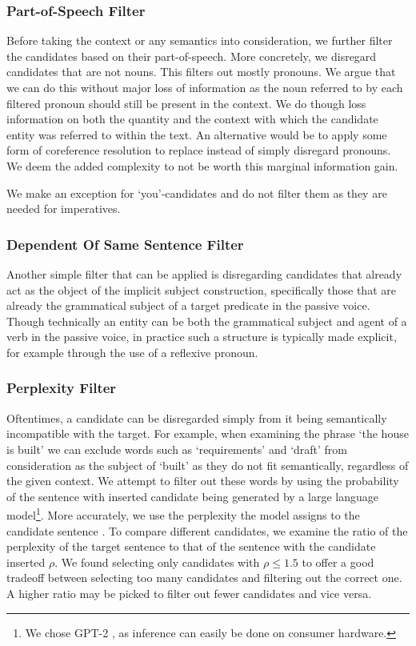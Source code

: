 \documentclass[times, 10pt,twocolumn]{article}
\begin{document}
\subsubsection{Part-of-Speech Filter}
Before taking the context or any semantics into consideration, we further filter the candidates
based on their part-of-speech. More concretely, we disregard candidates that are not nouns.
This filters out mostly pronouns. We argue that we can do this without major loss of information
as the noun referred to by each filtered pronoun should still be present in the context. We do though
loss information on both the quantity and the context with which the candidate entity was referred to
within the text. An alternative would be to apply some form of coreference resolution to replace instead
of simply disregard pronouns. We deem the added complexity to not be worth this marginal information gain.

We make an exception for `you'-candidates and do not filter them as they are needed for imperatives.


\subsubsection{Dependent Of Same Sentence Filter}
Another simple filter that can be applied is disregarding candidates that already act as the object of
the implicit subject construction, specifically those that are already the grammatical subject of
a target predicate in the passive voice. Though technically an entity can be both the grammatical subject and
agent of a verb in the passive voice, in practice such a structure is typically made explicit, for example
through the use of a reflexive pronoun.

\subsubsection{Perplexity Filter}
Oftentimes, a candidate can be disregarded simply from it being semantically incompatible with
the target. For example, when examining the phrase `the house is built' we can exclude
words such as `requirements' and `draft' from consideration as the subject of `built' as they
do not fit semantically, regardless of the given context. We attempt to filter out these words
by using the probability of the sentence with inserted candidate being generated by
a large language model\footnote{We chose GPT-2 \cite{gpt2}, as inference can easily be done on consumer hardware.}.
More accurately, we use the perplexity the model assigns to the candidate sentence \cite{jurafsky}.
To compare different candidates, we examine the ratio of the perplexity of the target sentence
to that of the sentence with the candidate inserted \(\rho\). We found selecting only candidates with
\(\rho \leq 1.5\) to offer a good
tradeoff between selecting too many candidates and filtering out the correct one. A higher ratio
may be picked to filter out fewer candidates and vice versa.
\end{document}

